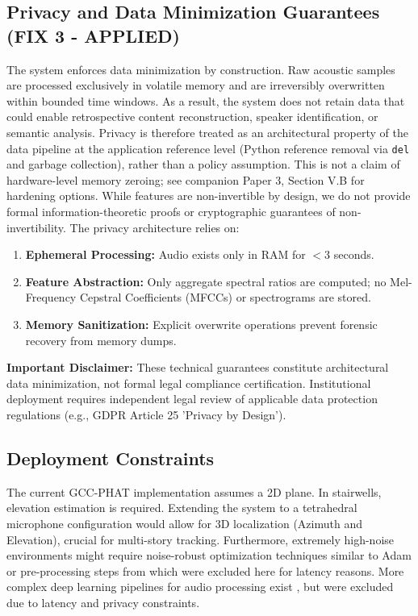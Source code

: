 \documentclass[conference]{IEEEtran}
\begin{document}
\subsection{Privacy and Data Minimization Guarantees (FIX 3 - APPLIED)}
The system enforces data minimization by construction. Raw acoustic samples are processed exclusively in volatile memory and are irreversibly overwritten within bounded time windows. As a result, the system does not retain data that could enable retrospective content reconstruction, speaker identification, or semantic analysis. Privacy is therefore treated as an architectural property of the data pipeline at the application reference level (Python reference removal via \texttt{del} and garbage collection), rather than a policy assumption. This is not a claim of hardware-level memory zeroing; see companion Paper 3, Section V.B for hardening options. While features are non-invertible by design, we do not provide formal information-theoretic proofs or cryptographic guarantees of non-invertibility. The privacy architecture relies on:
\begin{enumerate}
    \item \textbf{Ephemeral Processing:} Audio exists only in RAM for $<$3 seconds.
    \item \textbf{Feature Abstraction:} Only aggregate spectral ratios are computed; no Mel-Frequency Cepstral Coefficients (MFCCs) or spectrograms are stored.
    \item \textbf{Memory Sanitization:} Explicit overwrite operations prevent forensic recovery from memory dumps.
\end{enumerate}

\textbf{Important Disclaimer:} These technical guarantees constitute architectural data minimization, not formal legal compliance certification. Institutional deployment requires independent legal review of applicable data protection regulations (e.g., GDPR Article 25 'Privacy by Design').

\subsection{Deployment Constraints}
The current GCC-PHAT implementation assumes a 2D plane. In stairwells, elevation estimation is required. Extending the system to a tetrahedral microphone configuration  would allow for 3D localization (Azimuth and Elevation), crucial for multi-story tracking. Furthermore, extremely high-noise environments might require noise-robust optimization techniques similar to Adam \cite{b13} or pre-processing steps from \cite{b20} which were excluded here for latency reasons. More complex deep learning pipelines for audio processing exist \cite{b20}, but were excluded due to latency and privacy constraints.
\end{document}
